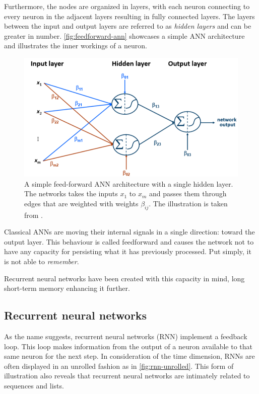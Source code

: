 Furthermore, the nodes are organized in layers, with each neuron connecting to every neuron in the adjacent layers resulting in fully connected layers. The layers between the input and output layers are referred to as \textit{hidden layers} and  can be greater in number. \autoref{fig:feedforward-ann} showcases a simple ANN architecture and illustrates the inner workings of a neuron.

\begin{figure}
    \centering
    \includegraphics[width=.85\textwidth]{gfx/feedforward-neural-network.png}
    \caption{A simple feed-forward ANN architecture with a single hidden layer. The networks takes the inputs $x_1$ to $x_m$ and passes them through edges that are weighted with weights $\beta_{ij}$. The illustration is taken from \cite{lessmannBADS}.}
    \label{fig:feedforward-ann}
\end{figure}

Classical ANNs are moving their internal signals in a single direction: toward the output layer. This behaviour is called feedforward and causes the network not to have any capacity for persisting what it has previously processed. Put simply, it is not able to \textit{remember}.

Recurrent neural networks have been created with this capacity in mind, long short-term memory enhancing it further.

\subsection{Recurrent neural networks}
As the name suggests, recurrent neural networks (RNN) implement a feedback loop. This loop makes information from the output of a neuron available to that same neuron for the next step. In consideration of the time dimension, RNNs are often displayed in an unrolled fashion as in \autoref{fig:rnn-unrolled}. This form of illustration also reveals that recurrent neural networks are intimately related to sequences and lists.


